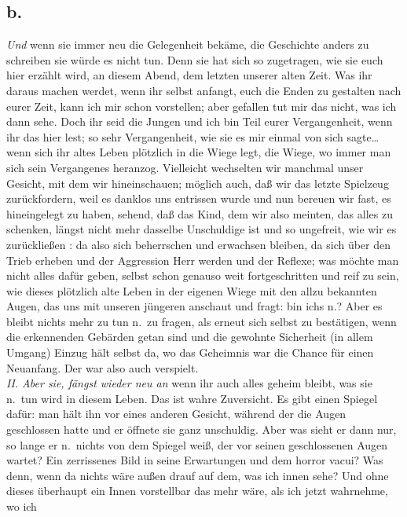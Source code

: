 \documentclass[
]{article}
\author{}
\date{\vspace{-2.5em}}
\begin{document}
\subsection{b.}\label{b.}

\emph{Und} wenn sie immer neu die Gelegenheit bekäme, die Geschichte
anders zu schreiben sie würde es nicht tun. Denn sie hat sich so
zugetragen, wie sie euch hier erzählt wird, an diesem Abend, dem letzten
unserer alten Zeit. Was ihr daraus machen werdet, wenn ihr selbst
anfangt, euch die Enden zu gestalten nach eurer Zeit, kann ich mir schon
vorstellen; aber gefallen tut mir das nicht, was ich dann sehe. Doch ihr
seid die Jungen und ich bin Teil eurer Vergangenheit, wenn ihr das hier
lest; so sehr Vergangenheit, wie sie es mir einmal von sich
sagte\ldots{} wenn sich ihr altes Leben plötzlich in die Wiege legt, die
Wiege, wo immer man sich sein Vergangenes heranzog. Vielleicht
wechselten wir manchmal unser Gesicht, mit dem wir hineinschauen;
möglich auch, daß wir das letzte Spielzeug zurückfordern, weil es
danklos uns entrissen wurde und nun bereuen wir fast, es hineingelegt zu
haben, sehend, daß das Kind, dem wir also meinten, das alles zu
schenken, längst nicht mehr dasselbe Unschuldige ist und so ungefreit,
wie wir es zurückließen : da also sich beherrschen und erwachsen
bleiben, da sich über den Trieb erheben und der Aggression Herr werden
und der Reflexe; was möchte man nicht alles dafür geben, selbst schon
genauso weit fortgeschritten und reif zu sein, wie dieses plötzlich alte
Leben in der eigenen Wiege mit den allzu bekannten Augen, das uns mit
unseren jüngeren anschaut und fragt: bin ichs n.? Aber es bleibt nichts
mehr zu tun n.~zu fragen, als erneut sich selbst zu bestätigen, wenn die
erkennenden Gebärden getan sind und die gewohnte Sicherheit (in allem
Umgang) Einzug hält selbst da, wo das Geheimnis war die Chance für einen
Neuanfang. Der war also auch verspielt.\\
\emph{II. Aber sie, fängst wieder neu an} wenn ihr auch alles geheim
bleibt, was sie n.~tun wird in diesem Leben. Das ist wahre Zuversicht.
Es gibt einen Spiegel dafür: man hält ihn vor eines anderen Gesicht,
während der die Augen geschlossen hatte und er öffnete sie ganz
unschuldig. Aber was sieht er dann nur, so lange er n.~nichts von dem
Spiegel weiß, der vor seinen geschlossenen Augen wartet? Ein zerrissenes
Bild in seine Erwartungen und dem horror vacui? Was denn, wenn da nichts
wäre außen drauf auf dem, was ich innen sehe? Und ohne dieses überhaupt
ein Innen vorstellbar das mehr wäre, als ich jetzt wahrnehme, wo ich
\end{document}
